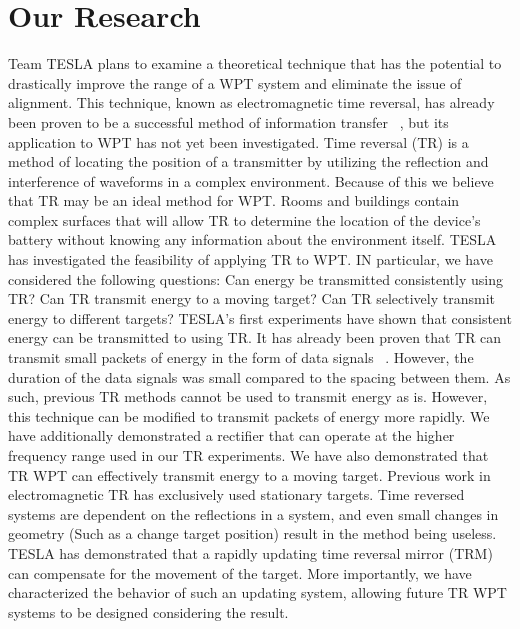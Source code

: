\section{Our Research}
Team TESLA plans to examine a theoretical technique that has the potential to drastically improve the range of a WPT system and eliminate the issue of alignment. This technique, known as electromagnetic time reversal, has already been proven to be a successful method of information transfer ~\cite{nltr-wave-chaotic,cepni2005experimental}, but its application to WPT has not yet been investigated. Time reversal (TR) is a method of locating the position of a transmitter by utilizing the reflection and interference of waveforms in a complex environment. Because of this we believe that TR may be an ideal method for WPT. Rooms and buildings contain complex surfaces that will allow TR to determine the location of the device's battery without knowing any information about the environment itself.
TESLA has investigated the feasibility of applying TR to WPT. IN particular, we have considered the following questions: Can energy be transmitted consistently using TR? Can TR transmit energy to a moving target? Can TR selectively transmit energy to different targets?
TESLA's first experiments have shown that consistent energy  can be transmitted to using TR. It has already been proven that TR can transmit small packets of energy in the form of data signals ~\cite{nltr-wave-chaotic}. However, the duration of the data signals was small compared to the spacing between them. As such, previous TR methods cannot be used to transmit energy as is.  However, this technique can be modified to transmit packets of energy more rapidly.  We have additionally demonstrated a rectifier that can operate at the higher frequency range used in our TR experiments.
We have also demonstrated that TR WPT can effectively transmit energy to a moving target. Previous work in electromagnetic TR has exclusively used stationary targets. Time reversed systems are dependent on the reflections in a system, and even small changes in geometry (Such as a change target position) result in the method being useless.  TESLA has demonstrated that a rapidly updating time reversal mirror (TRM) can compensate for the movement of the target.  More importantly, we have characterized the behavior of such an updating system, allowing future TR WPT systems to be designed considering the result.

